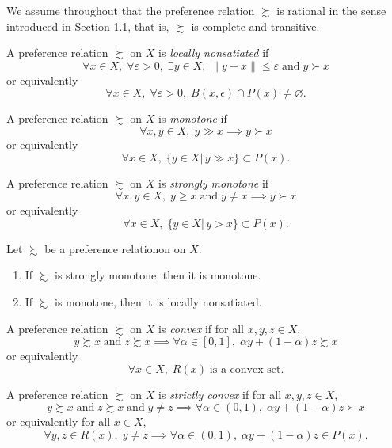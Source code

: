 \documentclass[12pt,fleqn]{book} %
\begin{document}
We assume throughout that the preference relation $\succsim$ is rational in the sense introduced in Section 1.1, that is, $\succsim$ is complete and transitive.

\begin{definition}
	A preference relation $\succsim$ on $X$ is \emph{locally nonsatiated} if
	\[
	\forall x\in X,\;\forall \varepsilon>0,\;\exists y\in X,\;\|y-x\|\le\varepsilon\;\text{and}\;y\succ x
	\]
	or equivalently
	\[
	\forall x\in X,\;\forall \varepsilon>0,\;B(x,\epsilon)\cap P(x)\ne\varnothing.
	\]
\end{definition}

\begin{definition}[Monotonicity]
	A preference relation $\succsim$ on $X$ is \emph{monotone} if
	\[
	\forall x,y\in X,\;y\gg x\implies y\succ x
	\]
	or equivalently
	\[
	\forall x\in X,\;\{y\in X|\,y\gg x\}\subset P(x).
	\]
\end{definition}

\begin{definition}
	A preference relation $\succsim$ on $X$ is \emph{strongly monotone} if
	\[
	\forall x,y\in X,\;y\geqslant x\;\text{and}\;y\ne x\implies y\succ x
	\]
	or equivalently
	\[
	\forall x\in X,\;\{y\in X|\,y> x\}\subset P(x).
	\]
\end{definition}

\begin{proposition}
	Let $\succsim$ be a preference relationon on $X$.
	\begin{enumerate}	
		\item If $\succsim$ is strongly monotone, then it is monotone.	
		\item If $\succsim$ is monotone, then it is locally nonsatiated.		 
	\end{enumerate}
\end{proposition}

\begin{definition}[Convexity]
	A preference relation $\succsim$ on $X$ is \emph{convex} if for all $x,y,z\in X$,
	\[
    y\succsim x\;\text{and}\;z\succsim x\implies \forall\alpha\in[0,1],\;\alpha y+(1-\alpha)z\succsim x
    \]
	or equivalently
	\[
	\forall x\in X,\;R(x)\;\text{is a convex set}.
	\]
\end{definition}

\begin{definition}
	A preference relation $\succsim$ on $X$ is \emph{strictly convex} if for all $x,y,z\in X$,
	\[
	y\succsim x\;\text{and}\;z\succsim x\;\text{and}\;y\ne z\implies \forall\alpha\in(0,1),\;\alpha y+(1-\alpha)z\succ x
	\]
	or equivalently for all $x\in X$,
	\[
	\forall y,z\in R(x),\;y\ne z\implies\forall\alpha\in(0,1),\;\alpha y+(1-\alpha)z\in P(x).
	\]
\end{definition}
\end{document}
